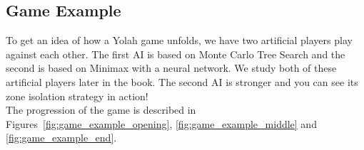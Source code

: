 \documentclass[12pt,a4paper,twoside,openright]{book}
\begin{document}




\subsection{Game Example}


To get an idea of how a Yolah game unfolds, we have two artificial players play against each other. The first AI is based on Monte Carlo Tree Search and the second is based on Minimax with a neural network. We study both of these artificial players later in the book. The second AI is stronger and you can see its zone isolation strategy in action!\\


The progression of the game is described in Figures~\ref{fig:game_example_opening}, \ref{fig:game_example_middle} and \ref{fig:game_example_end}.\\
\end{document}
